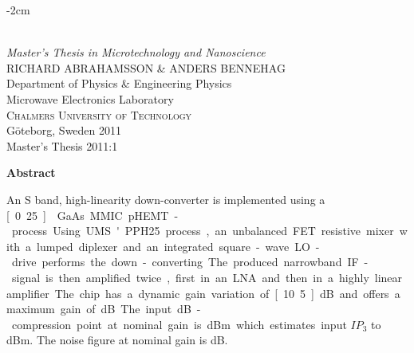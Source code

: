 \else
	\begin{titlepage}
	\begin{adjustwidth}{}{-2cm}
	
	\mbox{}
	\vfill
	\addtolength{\voffset}{2cm}
	\begin{flushleft}
		{ \\[0.5cm]
		\emph{\Large Master's Thesis in Microtechnology and Nanoscience} \\[.8cm]
		
		{\Large RICHARD ABRAHAMSSON \& ANDERS BENNEHAG}\\[.8cm]
		
		{\Large Department of Physics \& Engineering Physics \\
		Microwave Electronics Laboratory \\
		\textsc{Chalmers University of Technology} \\
		Göteborg, Sweden 2011 \\
		Master's Thesis 2011:1\\
		} 
		}
	\end{flushleft}
	
	\end{adjustwidth}
	\end{titlepage}
	\ClearShipoutPicture
	
\fi

\newpage

\ifdefined\saab
\else
	\clearpage
	\thispagestyle{empty}
\fi

\begin{center}
{\bf Abstract} \\[0.4cm]
\end{center}
	An S band, high-linearity down-converter is implemented using a \unit[0.25]{\mum} GaAs MMIC pHEMT-process. Using UMS' PPH25 process, an unbalanced FET resistive mixer with a lumped diplexer and an integrated square-wave LO-drive performs the down-converting. The produced narrowband IF-signal is then  amplified twice, first in an LNA and then in a highly linear amplifier. The chip has a dynamic gain variation of \unit[10.5]{dB} and offers a maximum gain of \unit[15]{dB}. The input \unit[1]{dB}-compression point at nominal gain is \unit[10]{dBm} which estimates input $IP_3$ to \unit[20]{dBm}. The noise figure at nominal gain is \unit[11]{dB}.
	
